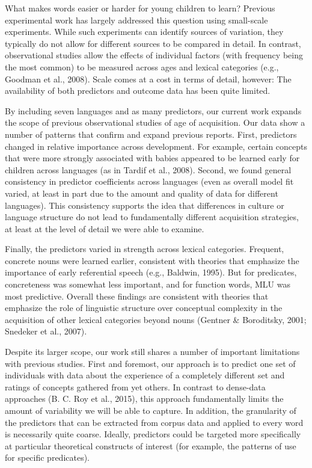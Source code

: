 \documentclass[10pt, letterpaper]{article}
\begin{document}
What makes words easier or harder for young children to learn? Previous
experimental work has largely addressed this question using small-scale
experiments. While such experiments can identify sources of variation,
they typically do not allow for different sources to be compared in
detail. In contrast, observational studies allow the effects of
individual factors (with frequency being the most common) to be measured
across ages and lexical categories (e.g., Goodman et al., 2008). Scale
comes at a cost in terms of detail, however: The availability of both
predictors and outcome data has been quite limited.

By including seven languages and as many predictors, our current work
expands the scope of previous observational studies of age of
acquisition. Our data show a number of patterns that confirm and expand
previous reports. First, predictors changed in relative importance
across development. For example, certain concepts that were more
strongly associated with babies appeared to be learned early for
children across languages (as in Tardif et al., 2008). Second, we found
general consistency in predictor coefficients across languages (even as
overall model fit varied, at least in part due to the amount and quality
of data for different languages). This consistency supports the idea
that differences in culture or language structure do not lead to
fundamentally different acquisition strategies, at least at the level of
detail we were able to examine.

Finally, the predictors varied in strength across lexical categories.
Frequent, concrete nouns were learned earlier, consistent with theories
that emphasize the importance of early referential speech (e.g.,
Baldwin, 1995). But for predicates, concreteness was somewhat less
important, and for function words, MLU was most predictive. Overall
these findings are consistent with theories that emphasize the role of
linguistic structure over conceptual complexity in the acquisition of
other lexical categories beyond nouns (Gentner \& Boroditsky, 2001;
Snedeker et al., 2007).

Despite its larger scope, our work still shares a number of important
limitations with previous studies. First and foremost, our approach is
to predict one set of individuals with data about the experience of a
completely different set and ratings of concepts gathered from yet
others. In contrast to dense-data approaches (B. C. Roy et al., 2015),
this approach fundamentally limits the amount of variability we will be
able to capture. In addition, the granularity of the predictors that can
be extracted from corpus data and applied to every word is necessarily
quite coarse. Ideally, predictors could be targeted more specifically at
particular theoretical constructs of interest (for example, the patterns
of use for specific predicates).
\end{document}
